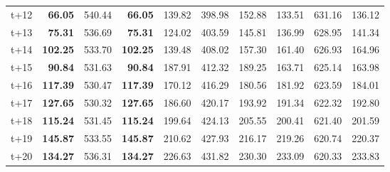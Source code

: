 \begin{table}[H]
\begin{tabular}{lrrrrrrrrr}
t+12  & \textbf{66.05}  & 540.44  & \textbf{66.05}  & 139.82  & 398.98  & 152.88  & 133.51  & 631.16  & 136.12  \\
t+13  & \textbf{75.31}  & 536.69  & \textbf{75.31}  & 124.02  & 403.59  & 145.81  & 136.99  & 628.95  & 141.34  \\
t+14  & \textbf{102.25}  & 533.70  & \textbf{102.25}  & 139.48  & 408.02  & 157.30  & 161.40  & 626.93  & 164.96  \\
t+15  & \textbf{90.84}  & 531.63  & \textbf{90.84}  & 187.91  & 412.32  & 189.25  & 163.71  & 625.14  & 163.98  \\
t+16  & \textbf{117.39}  & 530.47  & \textbf{117.39}  & 170.12  & 416.29  & 180.56  & 181.92  & 623.59  & 184.01  \\
t+17  & \textbf{127.65}  & 530.32  & \textbf{127.65}  & 186.60  & 420.17  & 193.92  & 191.34  & 622.32  & 192.80  \\
t+18  & \textbf{115.24}  & 531.45  & \textbf{115.24}  & 199.64  & 424.13  & 205.55  & 200.41  & 621.40  & 201.59  \\
t+19  & \textbf{145.87}  & 533.55  & \textbf{145.87}  & 210.62  & 427.93  & 216.17  & 219.26  & 620.74  & 220.37  \\
t+20  & \textbf{134.27}  & 536.31  & \textbf{134.27}  & 226.63  & 431.82  & 230.30  & 233.09  & 620.33  & 233.83  \\

\bottomrule
\end{tabular}
\end{table}
